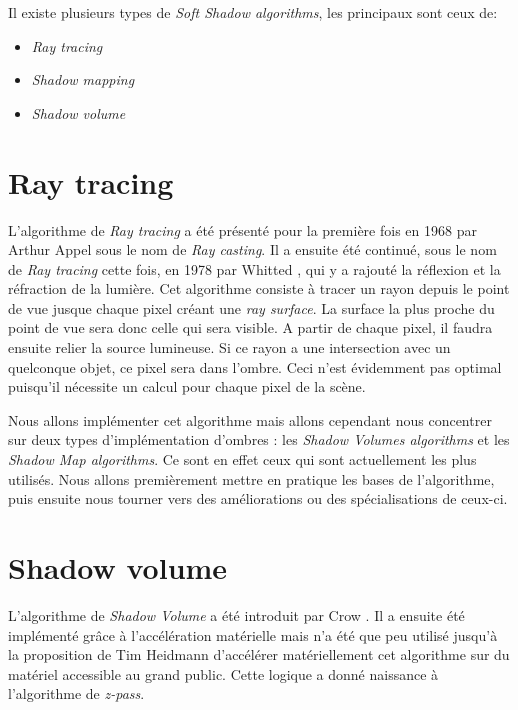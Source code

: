 \documentclass[a4paper,10pt]{report}
\begin{document}
Il existe plusieurs types de \textit{Soft Shadow algorithms}, les principaux sont ceux de:
\begin{itemize}
\item{\textit{Ray tracing}}
\item{\textit{Shadow mapping}}
\item{\textit{Shadow volume}}
\end{itemize}

\pagebreak

\section{Ray tracing}


L'algorithme de \textit{Ray tracing} a été présenté pour la première fois en 1968 par Arthur Appel\cite{appel1968some} sous le nom de \textit{Ray casting}. Il a ensuite été continué, sous le nom de \textit{Ray tracing} cette fois, en 1978 par Whitted \cite{whitted1978scan}, qui y a rajouté la réflexion et la réfraction de la lumière. 
Cet algorithme consiste à tracer un rayon depuis le point de vue jusque chaque pixel créant une \textit{ray surface}. La surface la plus proche du point de vue sera donc celle qui sera visible. A partir de chaque pixel, il faudra ensuite relier la source lumineuse. Si ce rayon a une intersection avec un quelconque objet, ce pixel sera dans l'ombre. Ceci n'est évidemment pas optimal puisqu'il nécessite un calcul pour chaque pixel de la scène.

Nous allons implémenter cet algorithme mais allons cependant  nous concentrer sur deux types d'implémentation d'ombres : les \textit{Shadow Volumes algorithms} et les \textit{Shadow Map algorithms}. Ce sont en effet ceux qui sont actuellement les plus utilisés. Nous allons premièrement mettre en pratique les bases de l'algorithme, puis ensuite nous tourner vers des améliorations ou des spécialisations de ceux-ci.


\section{Shadow volume}


L'algorithme de \textit{Shadow Volume} a été introduit par Crow \cite{crow1977shadow}. Il a ensuite été implémenté grâce à l'accélération  matérielle\cite{fuchs1986fast} mais n'a été que peu utilisé jusqu'à la proposition de Tim Heidmann d'accélérer matériellement cet algorithme sur du matériel accessible au grand public. Cette logique a donné naissance à l'algorithme de \textit{z-pass}\cite{heidmann1991real}. 
\\
\end{document}

